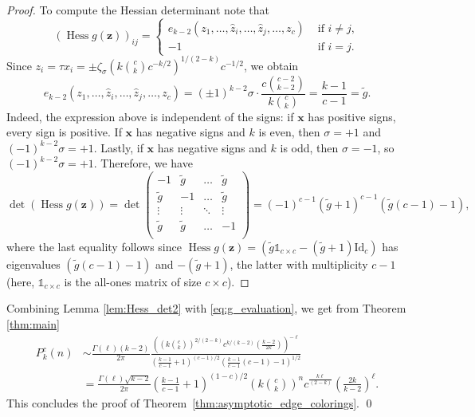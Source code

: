 \documentclass[a4paper,oneside]{amsart}
\newcommand{\bb}[1]{\boldsymbol{#1}}
\numberwithin{theorem}{section}
\theoremstyle{remark}
\newcommand{\cE}{{P}}
\DeclareMathOperator{\Hess}{Hess}
\begin{document}
\begin{proof}
To compute the Hessian determinant note that 
\[
  (\Hess g(\bb{z}))_{ij} = \left\{ \begin{array}{ll}
    e_{k-2}(z_1,\dots,\hat{z}_i,\dots,\hat{z}_j,\dots,z_c) & \text{ if } i\neq j, \\
    -1 & \text{ if } i=j.
  \end{array} \right.
\]
Since $z_i = \tau x_i = \pm \zeta_\sigma \left( k \binom{c}{k} c^{-k/2} \right)^{1/(2-k)} c^{-1/2}$, we obtain 
\[
  e_{k-2}(z_1,\dots,\hat{z}_i,\dots,\hat{z}_j,\dots,z_c) = (\pm 1)^{k-2} \sigma \cdot \frac{c \binom{c-2}{k-2}}{k \binom{c}{k}} = \frac{k-1}{c-1} = \tilde{g}.
\]
Indeed, the expression above is independent of the signs: if $\bb{x}$ has positive signs, every sign is positive. If $\bb{x}$ has negative signs and $k$ is even, then $\sigma = +1$ and $(-1)^{k-2}\sigma = +1$. Lastly, if $\bb{x}$ has negative signs and $k$ is odd, then $\sigma = -1$, so $(-1)^{k-2}\sigma = +1$. Therefore, we have
\[
  \det \left( \Hess g(\bb{z}) \right) = \det \begin{pmatrix}
      -1 & \tilde{g} & \dots & \tilde{g} \\
      \tilde{g} & -1 & \dots & \tilde{g} \\
      \vdots & \vdots & \ddots & \vdots \\ 
      \tilde{g} & \tilde{g} & \dots & -1 \\
    \end{pmatrix}
    = (-1)^{c-1}(\tilde{g} +1)^{c-1} (\tilde{g}(c-1) -1),
\]
where the last equality follows since $\Hess g(\bb{z}) = (\tilde{g}\mathbb{1}_{c\times c} - (\tilde{g} + 1)\mathrm{Id}_{c})$ has eigenvalues $(\tilde{g}(c-1) -1)$ and $-(\tilde{g} +1)$, the latter with multiplicity $c-1$ (here, $\mathbb{1}_{c\times c}$ is the all-ones matrix of size $c\times c$). 
\end{proof}

Combining Lemma \ref{lem:Hess_det2} with \eqref{eq:g_evaluation}, we get from Theorem \ref{thm:main}
\begin{align*}
    \cE^{c}_k(n) & \sim \frac{\Gamma(\ell)(k-2)}{2\pi} \frac{\left( \left(k\binom{c}{k}\right)^{2/(2-k)} c^{k/(k-2)} \left(\frac{k-2}{2k}\right) \right)^{-\ell}}{\left(\frac{k-1}{c-1} + 1 \right)^{(c-1)/2} \left(\frac{k-1}{c-1} (c-1) -1 \right)^{1/2}} \\
    & = \frac{\Gamma(\ell)\sqrt{k-2}}{2\pi} \left( \frac{k-1}{c-1} + 1 \right)^{(1-c)/2} \left( k \binom{c}{k} \right)^n c^{\frac{k\ell}{(2-k)}} \left( \frac{2k}{k-2} \right)^\ell.
\end{align*}
This concludes the proof of Theorem~\ref{thm:asymptotic_edge_colorings}. \qed
\end{document}
